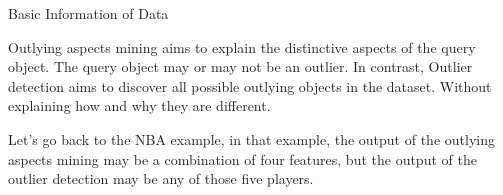 \documentclass[
 size=12pt,
 paper=smartboard,  %
 mode=present, 		%
 display=slides, 	%
 style=tuliplab,  	%
 pauseslide,
 fleqn,leqno]{powerdot}
\begin{document}
\begin{slide}{Basic Information of Data}
\begin{note}
Outlying aspects mining aims to
explain the distinctive aspects of the query object.
The query object may or may not be an outlier.
In contrast,
Outlier detection aims to discover all possible
outlying objects in the dataset.
Without explaining how and why they are different.

Let's go back to the NBA example,
in that example,
the output of the outlying aspects mining may be
a combination of four features,
but the output of the outlier detection may be any of those five players.
\end{note}

\end{slide}
\end{document}
